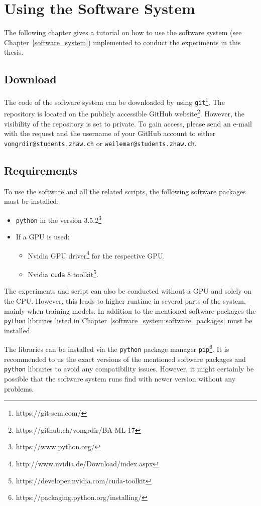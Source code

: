 \chapter{Using the Software System}
\label{appendix:software_usage}
The following chapter gives a tutorial on how to use the software system (see Chapter~\ref{software_system}) implemented to conduct the experiments in this thesis.

\section{Download}
The code of the software system can be downloaded by using \texttt{git}\footnote{https://git-scm.com/}. The repository is located on the publicly accessible GitHub website\footnote{https://github.ch/vongrdir/BA-ML-17}. However, the visibility of the repository is set to private. To gain access, please send an e-mail with the request and the username of your GitHub account to either \texttt{vongrdir@students.zhaw.ch} or \texttt{weilemar@students.zhaw.ch}.

\section{Requirements}
To use the software and all the related scripts, the following software packages must be installed:

\begin{itemize}[noitemsep]
	\item \texttt{python} in the version 3.5.2\footnote{https://www.python.org/}
	\item If a GPU is used:
	\begin{itemize}[noitemsep]
		\item Nvidia GPU driver\footnote{http://www.nvidia.de/Download/index.aspx} for the respective GPU.
		\item Nvidia \texttt{cuda} 8 toolkit\footnote{https://developer.nvidia.com/cuda-toolkit}.
	\end{itemize}
\end{itemize}

The experiments and script can also be conducted without a GPU and solely on the CPU. However, this leads to higher runtime in several parts of the system, mainly when training models. In addition to the mentioned software packages the \texttt{python} libraries listed in Chapter~\ref{software_system:software_packages} must be installed.

The libraries can be installed via the \texttt{python} package manager \texttt{pip}\footnote{https://packaging.python.org/installing/}. It is recommended to us the exact versions of the mentioned software packages and \texttt{python} libraries to avoid any compatibility issues. However, it might certainly be possible that the software system runs find with newer version without any problems.

